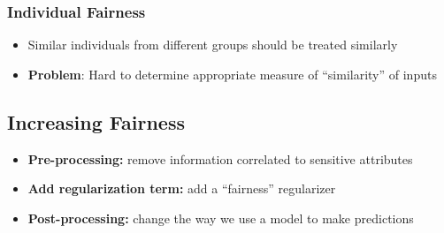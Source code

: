 \documentclass[11pt]{article}
\begin{document}
\subsubsection{Individual Fairness }
\begin{itemize}
\item Similar individuals from different groups should be treated similarly
\item \textbf{Problem}: Hard to determine appropriate measure of “similarity” of inputs
\end{itemize}

\subsection{Increasing Fairness}
\begin{itemize}
\item \textbf{Pre-processing:} remove information correlated to sensitive attributes
\item \textbf{Add regularization term:} add a “fairness” regularizer
\item \textbf{Post-processing:} change the way we use a model to make predictions
\end{itemize}
\end{document}
